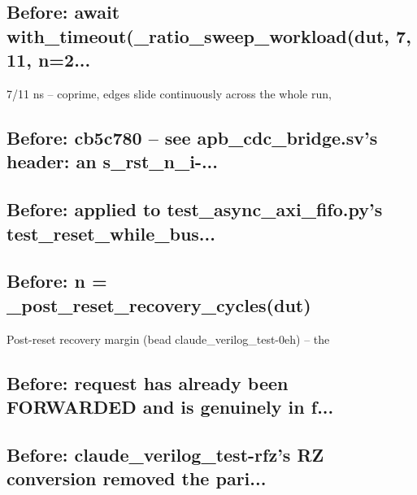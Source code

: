 \begin{record}
\subsection*{Before: await with\_timeout(\_ratio\_sweep\_workload(dut, 7, 11, n=2...}

\begin{textblock}
7/11 ns -- coprime, edges slide continuously across the whole run,
\end{textblock}

\subsection*{Before: cb5c780 -- see apb\_cdc\_bridge.sv's header: an s\_rst\_n\_i-...}


\subsection*{Before: applied to test\_async\_axi\_fifo.py's test\_reset\_while\_bus...}


\subsection*{Before: n = \_post\_reset\_recovery\_cycles(dut)}

\begin{textblock}
Post-reset recovery margin (bead claude_verilog_test-0eh) -- the
\end{textblock}

\subsection*{Before: request has already been FORWARDED and is genuinely in f...}


\subsection*{Before: claude\_verilog\_test-rfz's RZ conversion removed the pari...}


\end{record}
